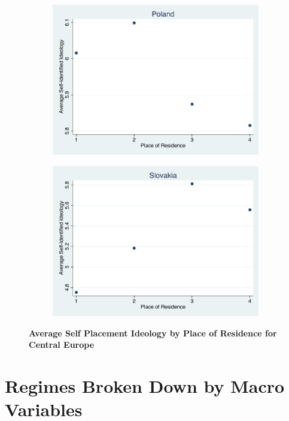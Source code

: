 \documentclass[12pt, titlepage]{article}
\newcommand\tb{\textbf}
\begin{document}
\begin{appendices}
\begin{figure}[H]
\begin{subfigure}[b]{0.475\textwidth}
		\includegraphics[width=\textwidth]{Ideology/Poland}
	\end{subfigure}
	\quad
	\begin{subfigure}[b]{0.475\textwidth}   
		\centering 
		\includegraphics[width=\textwidth]{Ideology/Slovakia}
	\end{subfigure}
	\caption[ Central Europe ]
	{\tb {Average Self Placement Ideology by Place of Residence for Central Europe} }
	\label{figureF3}
\end{figure}

\clearpage 

\section{Regimes Broken Down by Macro Variables}
\label{AppendixC}


\end{appendices}
\end{document}
